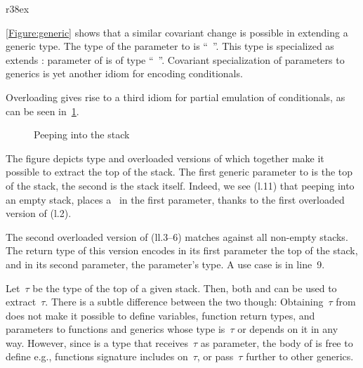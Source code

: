\begin{wrapfigure}[6]r{38ex}
  \caption{\label{Figure:generic} Covariance of parameters to generics}
\end{wrapfigure}

\cref{Figure:generic} shows that a similar covariant change is possible 
  in extending a generic type.
The type of the parameter  
  to  is ``\mbox{  }''.
This type is specialized as  extends :
  parameter  of  is of type  
  ``\mbox{  }''.
Covariant specialization of parameters to generics 
  is yet another idiom for encoding conditionals.

Overloading gives rise to a third idiom for partial emulation of conditionals, as can be seen
  in~\cref{Figure:peep}.

\begin{figure}[htb]%
  \caption{Peeping into the stack}%
  \label{Figure:peep}%
  \lstset{style=numbered}
\end{figure}

The figure depicts type  and overloaded versions of  which 
  together make it possible to extract the top of the stack.
The first generic parameter to  is the top of the stack, the second is the stack itself.
Indeed, we see (l.11) that peeping into an empty stack, places a~
  in the first parameter, thanks to the first overloaded version of  (l.2).

The second overloaded version of  (ll.3--6) matches
 against all non-empty stacks. 
The return type
 of this version encodes
 in its first parameter
 the top of the stack, and 
  in its second parameter, the parameter's type.
A use case is in line~9.

Let~$τ$ be the type of the top of a given stack.
Then, both  and  can be used to extract~$τ$.
There is a subtle difference between the two though:
Obtaining~$τ$ from  does
  not make it possible to define variables, function return types, and
  parameters to functions and generics whose type is~$τ$ or depends on it in any way.
However, since  is a type that receives~$τ$ as parameter,
  the body of  is free to define e.g., functions signature includes on~$τ$,
  or pass~$τ$ further to other generics.
